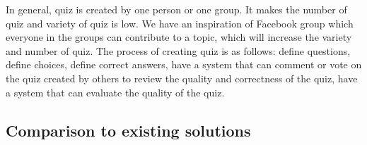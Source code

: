 \documentclass[a4paper, 12pt]{report}
\begin{document}
    In general, quiz is created by one person or one group. It makes the number of quiz and variety of quiz is low. We have an inspiration of Facebook group which everyone in the groups can contribute to a topic, which will increase the variety and number of quiz. The process of creating quiz is as follows: define questions, define choices, define correct answers, have a system that can comment or vote on the quiz created by others to review the quality and correctness of the quiz, have a system that can evaluate the quality of the quiz.

    \subsection*{Comparison to existing solutions}
    
\end{document}
